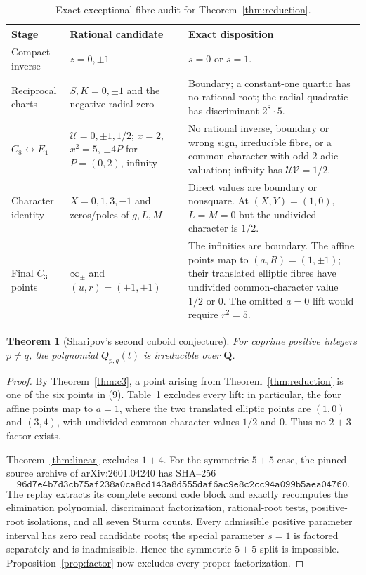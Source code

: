 \documentclass[11pt]{article}
\newtheorem{theorem}{Theorem}
\newcommand{\Q}{\mathbf Q}
\begin{document}
\begin{table}[ht]
\centering
\small
\begin{tabular}{p{}p{}p{}}
\toprule
Stage & Rational candidate & Exact disposition\\
\midrule
Compact inverse & $z=0,\pm1$ & $s=0$ or $s=1$.\\
Reciprocal charts & $S,K=0,\pm1$ and the negative radial zero &
Boundary; a constant-one quartic has no rational root; the radial
quadratic has discriminant $2^8\cdot5$.\\
$C_8\leftrightarrow E_1$ & $\mathcal U=0,\pm1,1/2$; $x=2$, $x^2=5$,
$\pm4P$ for $P=(0,2)$, infinity & No rational inverse, boundary or wrong sign,
irreducible fibre, or a common character with odd $2$-adic valuation;
infinity has $\mathcal U\mathcal V=1/2$.\\
Character identity & $X=0,1,3,-1$ and zeros/poles of $g,L,M$ &
Direct values are boundary or nonsquare.  At $(X,Y)=(1,0)$,
$L=M=0$ but the undivided character is $1/2$.\\
Final $C_3$ points & $\infty_\pm$ and $(u,r)=(\pm1,\pm1)$ &
The infinities are boundary.  The affine points map to
$(a,R)=(1,\pm1)$; their translated elliptic fibres have undivided
common-character value $1/2$ or $0$.  The omitted $a=0$ lift would require
$r^2=5$.\\
\bottomrule
\end{tabular}
\caption{Exact exceptional-fibre audit for Theorem~\ref{thm:reduction}.}
\label{tab:exceptions}
\end{table}

\begin{theorem}[Sharipov's second cuboid conjecture]
For coprime positive integers $p\ne q$, the polynomial $Q_{p,q}(t)$ is
irreducible over $\Q$.
\end{theorem}

\begin{proof}
By Theorem~\ref{thm:c3}, a point arising from
Theorem~\ref{thm:reduction} is one of the six points in (9).
Table~\ref{tab:exceptions} excludes every lift: in particular, the four
affine points map to $a=1$, where the two translated elliptic points are
$(1,0)$ and $(3,4)$, with undivided common-character values $1/2$ and $0$.
Thus no $2+3$ factor exists.

Theorem~\ref{thm:linear} excludes $1+4$.  For the symmetric $5+5$ case, the
pinned source archive of arXiv:2601.04240 has SHA--256
\[
\texttt{96d7e4b7d3cb75af238a0ca8cd143a8d555daf6ac9e8c2cc94a099b5aea04760}.
\]
The replay extracts its complete second code block and exactly recomputes the
elimination polynomial, discriminant factorization, rational-root tests,
positive-root isolations, and all seven Sturm counts.  Every admissible
positive parameter interval has zero real candidate roots; the special
parameter $s=1$ is factored separately and is inadmissible.  Hence the
symmetric $5+5$ split is impossible.  Proposition~\ref{prop:factor} now
excludes every proper factorization.
\end{proof}
\end{document}
